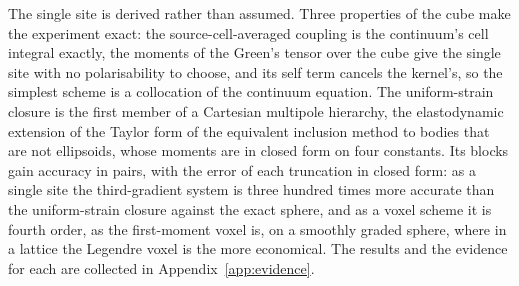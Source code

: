 \documentclass[preprint,review,12pt]{elsarticle}
\begin{document}
The single site is derived rather than assumed. Three properties of the cube make the experiment
exact: the source-cell-averaged coupling is the continuum's cell integral exactly, the moments of the
Green's tensor over the cube give the single site with no polarisability to choose, and its self term
cancels the kernel's, so the simplest scheme is a collocation of the continuum equation. The
uniform-strain closure is the first member of a Cartesian multipole hierarchy, the elastodynamic
extension of the
Taylor form of the equivalent inclusion method \citep{Moschovidis1975} to bodies that are not
ellipsoids, whose moments are in closed form on four constants. Its blocks gain accuracy in pairs,
with the error of each truncation in closed form: as a single site the third-gradient system is three
hundred times more accurate than the uniform-strain closure against the exact sphere, and as a voxel
scheme it is fourth order, as the first-moment voxel is, on a smoothly graded sphere, where in a lattice
the Legendre voxel is the more economical. The results and the evidence for each are collected in
Appendix~\ref{app:evidence}.
\end{document}
